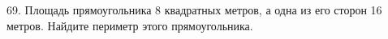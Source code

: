 69. Площадь прямоугольника 8 квадратных метров, а одна из его сторон 16 метров. Найдите периметр этого прямоугольника.\\
